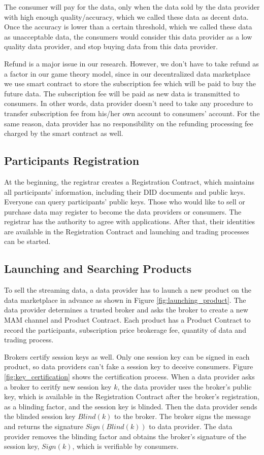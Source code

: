 \documentclass[journal,10pt,a4paper]{IEEEtran}
\begin{document}
The consumer will pay for the data, only when the data sold by the data provider with high enough quality/accuracy, which we called these data as decent data.
Once the accuracy is lower than a certain threshold, which we called these data as unacceptable data, the consumers would consider this data provider as a low quality data provider, and stop buying data from this data provider.

Refund is a major issue in our research. However, we don't have to take refund as a factor in our game theory model, since in our decentralized data marketplace we use smart contract to store the subscription fee which will be paid to buy the future data. The subscription fee will be paid as new data is transmitted to consumers. In other words, data provider doesn't need to take any procedure to transfer subscription fee from his/her own account to consumers' account. For the same reason, data provider has no responsibility on the refunding processing fee charged by the smart contract as well.

\subsection{Participants Registration}
At the beginning, the registrar creates a Registration Contract, which maintains all participants' information, including their DID documents and public keys. Everyone can query participants' public keys. Those who would like to sell or purchase data may register to become the data providers or consumers. The registrar has the authority to agree with applications. After that, their identities are available in the Registration Contract and launching and trading processes can be started.

\subsection{Launching and Searching Products}
To sell the streaming data, a data provider has to launch a new product on the data marketplace in advance as shown in Figure \ref{fig:launching_product}. The data provider determines a trusted broker and asks the broker to create a new MAM channel and Product Contract. Each product has a Product Contract to record the participants, subscription price brokerage fee, quantity of data and  trading process.

Brokers certify session keys as well. Only one session key can be signed in each product, so data providers can't fake a session key to deceive consumers. Figure \ref{fig:key_certification} shows the certification process. When a data provider asks a broker to ceritfy new session key $k$, the data provider uses the broker's public key, which is available in the Registration Contract after the broker's registration, as a blinding factor, and the session key is blinded. Then the data provider sends the blinded session key $Blind(k)$ to the broker. The broker signs the message and returns the signature $Sign(Blind(k))$ to data provider. The data provider removes the blinding factor and obtains the broker's signature of the session key, $Sign(k)$, which is verifiable by consumers.
\end{document}
